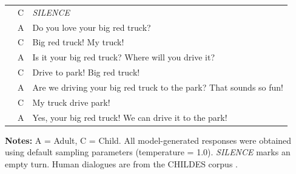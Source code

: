 \begin{table}[h]
\begin{tabularx}{\textwidth}{l l X}
    & C & \textit{SILENCE} \\
    & A & Do you love your big red truck? \\
    & C & Big red truck! My truck! \\
    & A & Is it your big red truck? Where will you drive it? \\
    & C & Drive to park! Big red truck! \\
    & A & Are we driving your big red truck to the park? That sounds so fun! \\
    & C & My truck drive park! \\
    & A & Yes, your big red truck! We can drive it to the park! \\
    
    \bottomrule
    \end{tabularx}
    
    \vspace{1mm}
    \raggedright
    \footnotesize
    \textbf{Notes:} A = Adult, C = Child. All model-generated responses were obtained using default sampling parameters (temperature = 1.0). \textit{SILENCE} marks an empty turn. Human dialogues are from the CHILDES corpus \citep{macwhinney2000childes}.
\end{table}

\clearpage
\endgroup
